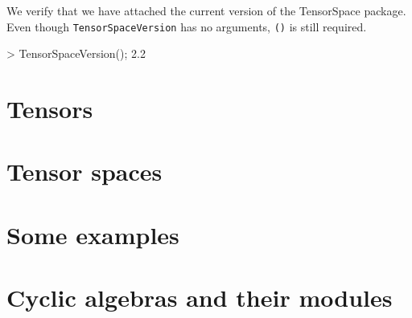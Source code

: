 \documentclass{documentation}
\begin{document}
\begin{example}[Version]
We verify that we have attached the current version of the TensorSpace package.
Even though \texttt{TensorSpaceVersion} has no arguments, \texttt{()} is still required.

\begin{code}
> TensorSpaceVersion();
2.2
\end{code}
\end{example}

\chapter{Tensors}\label{ch:tensors}




\chapter{Tensor spaces}\label{ch:tensor-spaces}



\chapter{Some examples}\label{ch:examples}



\appendix

\chapter{Cyclic algebras and their modules}\label{append:cyclic}



\backmatter
\end{document}
